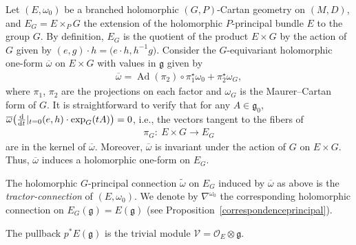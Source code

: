 \documentclass[10pt,a4paper]{amsart}
\numberwithin{equation}{section}
\begin{document}
Let $(E,\omega_0)$ be a branched holomorphic $(G,P)$-Cartan geometry on $(M,D)$, and $E_G=E\times_{P} G$ the extension of the holomorphic $P$-principal bundle $E$ to the group $G$. By definition, $E_G$ is the quotient of the product $E\times G$ by the action of $G$ given by $(e,g)\cdot h = \big(e\cdot h,h^{-1}g\big)$. Consider the $G$-equivariant holomorphic one-form $\overline{\omega}$ on $E\times G$ with values in $\mathfrak{g}$ given by
 \begin{gather*}%
 \overline{\omega}= \operatorname{Ad}(\pi_2)\circ \pi_1^\star \omega_0 + \pi_2^\star \omega_G, \end{gather*}
 where $\pi_1$, $\pi_2$ are the projections on each factor and $\omega_G$ is the Maurer--Cartan form of $G$. It is straightforward to verify that for any $A\in \mathfrak{g}_0$, $\overline{\omega}\big(\frac{\rm d}{{\rm d}t}\vert_{t=0}(e,h)\cdot \exp_G(tA)\big) =0$, i.e., the vectors tangent to the fibers of
 \begin{gather*}%
 \pi_G\colon\ E\times G \longrightarrow E_G
 \end{gather*}
 are in the kernel of $\overline{\omega}$. Moreover, $\overline{\omega}$ is invariant under the action of $G$ on $E\times G$. Thus, $\overline{\omega}$ induces a holomorphic one-form on $E_G$.
\begin{Definition}\label{tractorconnection} The holomorphic $G$-principal connection $\tilde{\omega}$ on $E_G$ induced by $\overline{\omega}$ as above is the \textit{tractor-connection} of $(E,\omega_0)$. We denote by $\nabla^{\omega_0}$ the corresponding holomorphic connection on $E_G(\mathfrak{g})=E(\mathfrak{g})$ (see Proposition~\ref{correspondenceprincipal}). \end{Definition}

The pullback $p^* E(\mathfrak{g})$ is the trivial module $\mathcal{V}=\mathcal{O}_E\otimes \mathfrak{g}$.
\end{document}

